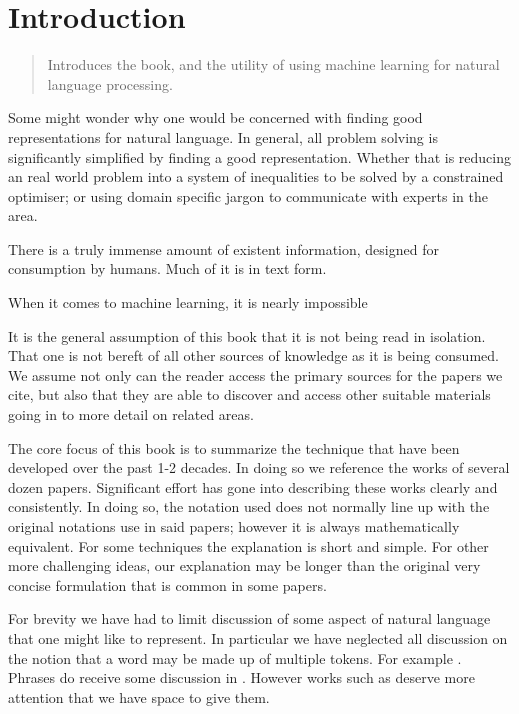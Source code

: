 \documentclass[12pt,parskip]{komatufte}
\begin{document}

\chapter{Introduction}\label{sec:introduction}
\begin{abstract}
	Introduces the book, and the utility of using machine learning for natural language processing.
\end{abstract}

Some might wonder why one would be concerned with finding good representations for natural language.
In general, all problem solving is significantly simplified by finding a good representation.
Whether that is reducing an real world problem into a system of inequalities to be solved by a constrained optimiser; or using domain specific jargon to communicate with experts in the area.

There is a truly immense amount of existent information, designed for consumption by humans.
Much of it is in text form.

When it comes to machine learning, it is nearly impossible 



It is the general assumption of this book that it is not being read in isolation.
That one is not bereft of all other sources of knowledge as it is being consumed.
We assume not only can the reader access the primary sources for the papers we cite,
but also that they are able to discover and access other suitable materials going in to more detail on related areas.

The core focus of this book is to summarize the technique that have been developed over the past 1-2 decades.
In doing so we reference the works of several dozen papers.
Significant effort has gone into describing these works clearly and consistently.
In doing so, the notation used does not normally line up with the original notations use in said papers; however it is always mathematically equivalent.
For some techniques the explanation is short and simple.
For other more challenging ideas, our explanation may be longer than the original very concise formulation that is common in some papers.





For brevity we have had to limit discussion of some aspect of natural language that one might like to represent.
In particular we have neglected all discussion on the notion that a word may be made up of multiple tokens.
For example .
Phrases do receive some discussion in .
However works such as  deserve more attention that we have space to give them.
\end{document}
